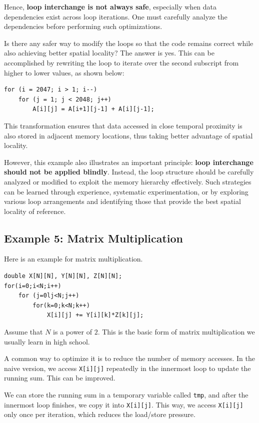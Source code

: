 \documentclass[12pt]{book}
\begin{document}
Hence, \textbf{loop interchange is not always safe}, especially when data dependencies exist across loop iterations. One must carefully analyze the dependencies before performing such optimizations.

Is there any safer way to modify the loops so that the code remains correct while also achieving better spatial locality? The answer is yes. This can be accomplished by rewriting the loop to iterate over the second subscript from higher to lower values, as shown below:

\begin{lstlisting}[style=cppstyle]
for (i = 2047; i > 1; i--)
    for (j = 1; j < 2048; j++)
        A[i][j] = A[i+1][j-1] + A[i][j-1];
\end{lstlisting}

This transformation ensures that data accessed in close temporal proximity is also stored in adjacent memory locations, thus taking better advantage of spatial locality.

However, this example also illustrates an important principle: \textbf{loop interchange should not be applied blindly}. Instead, the loop structure should be carefully analyzed or modified to exploit the memory hierarchy effectively. Such strategies can be learned through experience, systematic experimentation, or by exploring various loop arrangements and identifying those that provide the best spatial locality of reference.

\subsection{Example 5: Matrix Multiplication}
Here is an example for matrix multiplication.
\begin{lstlisting}[style=cppstyle]
double X[N][N], Y[N][N], Z[N][N];
for(i=0;i<N;i++)
    for (j=0lj<N;j++)
        for(k=0;k<N;k++)
            X[i][j] += Y[i][k]*Z[k][j];
\end{lstlisting}
Assume that $N$ is a power of $2$. This is the basic form of matrix multiplication we usually learn in high school.

A common way to optimize it is to reduce the number of memory accesses. In the naive version, we access \texttt{X[i][j]} repeatedly in the innermost loop to update the running sum. This can be improved.

We can store the running sum in a temporary variable called \texttt{tmp}, and after the innermost loop finishes, we copy it into \texttt{X[i][j]}. This way, we access \texttt{X[i][j]} only once per iteration, which reduces the load/store pressure.
\end{document}
